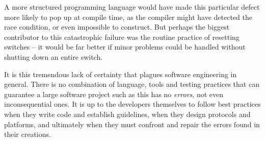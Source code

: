 \documentclass[12pt,a4paper,notitlepage]{article}
\begin{document}
A more structured programming language would have made this particular defect more likely to pop up at compile time, as the compiler might have detected the race condition, or even impossible to construct.
But perhaps the biggest contributor to this catastrophic failure was the routine practice of resetting switches -- it would be far better if minor problems could be handled without shutting down an entire switch.

It is this tremendous lack of certainty that plagues software engineering in general.
There is no combination of language, tools and testing practices that can guarantee a large software project such as this has no \textsl{errors}, not even inconsequential ones.
It is up to the developers themselves to follow best practices when they write code and establish guidelines, when they design protocols and platforms, and ultimately when they must confront and repair the errors found in their creations.

\printbibliography
\end{document}
